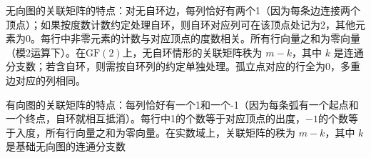 \documentclass[lang=cn,11pt]{elegantbook}
\begin{document}
无向图的关联矩阵的特点：对无自环边，每列恰好有两个1（因为每条边连接两个顶点）；如果按度数计数约定处理自环，则自环对应列可在该顶点处记为2，其他元素为0。每行中非零元素的计数与对应顶点的度数相关。所有行向量之和为零向量（模2运算下）。在$\mathrm{GF}(2)$上，无自环情形的关联矩阵秩为 $m - k$，其中 $k$ 是连通分支数；若含自环，则需按自环列的约定单独处理。孤立点对应的行全为0，多重边对应的列相同。

有向图的关联矩阵的特点：每列恰好有一个1和一个-1（因为每条弧有一个起点和一个终点，自环就相互抵消）。每行中1的个数等于对应顶点的出度，$-1$的个数等于入度，所有行向量之和为零向量。在实数域上，关联矩阵的秩为 $m - k$，其中 $k$ 是基础无向图的连通分支数














\newpage
\end{document}
